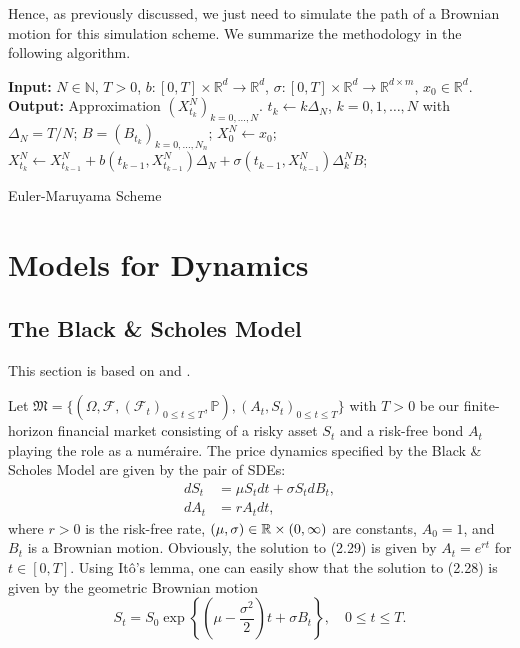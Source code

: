 Hence, as previously discussed, we just need to simulate the path of a Brownian motion for this simulation scheme. We summarize the methodology in the following algorithm.
\begin{algorithm}[H] 
\SetAlgoLined
    \textbf{Input:} $N\in\mathbb{N}$, $T>0$, $b:[0,T]\times \mathbb{R}^{d}\to\mathbb{R}^{d}$, $\sigma:[0,T]\times\mathbb{R}^{d}\to\mathbb{R}^{d\times m}$, $x_{0}\in\mathbb{R}^{d}$.\newline
    \textbf{Output:} Approximation $(X_{t_k}^{N})_{k=0,\dots,N}.$\newline
    $t_{k}\gets k\Delta_{N}$, $k=0,1,\dots,N$ with $\Delta_{N}=T/N$; \newline
    $B=(B_{t_k})_{k=0,\dots,N_{n}}$;\newline
    $X_0^{N}\gets x_0$;\newline
        {$X_{t_k}^{N}\gets X_{t_{k-1}}^{N} + b(t_{k-1},X_{t_{k-1}}^{N})\Delta_{N} + \sigma(t_{k-1},X_{t_{k-1}}^{N})\Delta_{k}^{N}B$;}
\caption{Euler-Maruyama Scheme}
\label{alg:euler}
\end{algorithm}

\section{Models for Dynamics}
\subsection{The Black \& Scholes Model}\label{sec:BSM}
This section is based on \cite{black1973} and \cite{blackscholes}.

Let $\mathfrak{M}=\{(\Omega,\mathcal{F},(\mathcal{F}_{t})_{0\leq t\leq T},\mathbb{P}), (A_{t},S_{t})_{0\leq t\leq T}\}$ with $T>0$ be our finite-horizon financial market consisting of a risky asset $S_{t}$ and a risk-free bond $A_{t}$ playing the role as a numéraire. The price dynamics specified by the Black \& Scholes Model are given by the pair of SDEs:
\begin{align}
    dS_{t}&=\mu S_{t}dt+\sigma S_{t}dB_{t},\\
    dA_{t}&=rA_{t}dt,
\end{align}
where $r>0$ is the risk-free rate, $(\mu,\sigma)\in\mathbb{R}\times (0,\infty)$ are constants, $A_{0}=1$, and $B_t$ is a Brownian motion. Obviously, the solution to (2.29) is given by $A_{t}=e^{rt}$ for $t\in [0,T]$. Using Itô's lemma, one can easily show that the solution to (2.28) is given by the geometric Brownian motion
\begin{equation}
    S_{t}=S_{0}\exp\left\{\left(\mu-\frac{\sigma^2}{2}\right)t+\sigma B_{t}\right\}, \quad 0\leq t\leq T.
\end{equation}


